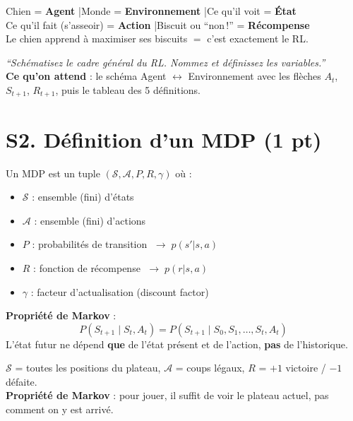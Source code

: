 \documentclass[11pt,a4paper]{article}
\begin{document}
\begin{exbox}
Chien = \textbf{Agent} \quad|\quad Monde = \textbf{Environnement} \quad|\quad Ce qu'il voit = \textbf{État}\\
Ce qu'il fait (s'asseoir) = \textbf{Action} \quad|\quad Biscuit ou ``non\,!'' = \textbf{Récompense}\\
Le chien apprend à maximiser ses biscuits $=$ c'est exactement le RL.
\end{exbox}

\begin{exambox}
\textit{``Schématisez le cadre général du RL. Nommez et définissez les variables.''}\\[4pt]
\textbf{Ce qu'on attend} : le schéma Agent $\leftrightarrow$ Environnement avec les flèches $A_t$, $S_{t+1}$, $R_{t+1}$, puis le tableau des 5 définitions.
\end{exambox}

\section{S2. Définition d'un MDP (1 pt)}

\begin{formbox}[MDP = Markov Decision Process]
Un MDP est un tuple $(\mathcal{S}, \mathcal{A}, P, R, \gamma)$ où :
\begin{itemize}[nosep]
\item $\mathcal{S}$ : ensemble (fini) d'états
\item $\mathcal{A}$ : ensemble (fini) d'actions
\item $P$ : probabilités de transition $\;\to\; p(s'|s, a)$
\item $R$ : fonction de récompense $\;\to\; p(r|s, a)$
\item $\gamma$ : facteur d'actualisation (discount factor)
\end{itemize}
\textbf{Propriété de Markov} :
$$P(S_{t+1} \mid S_t, A_t) = P(S_{t+1} \mid S_0, S_1, \ldots, S_t, A_t)$$
L'état futur ne dépend \textbf{que} de l'état présent et de l'action, \textbf{pas} de l'historique.
\end{formbox}

\begin{exbox}
$\mathcal{S}$ = toutes les positions du plateau, $\mathcal{A}$ = coups légaux, $R$ = $+1$ victoire / $-1$ défaite.\\
\textbf{Propriété de Markov} : pour jouer, il suffit de voir le plateau actuel, pas comment on y est arrivé.
\end{exbox}
\end{document}
